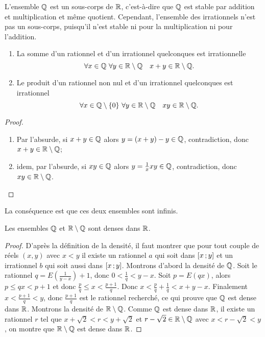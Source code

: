 L'ensemble \(\mathbb{Q}\) est un sous-corps de \(\mathbb{R}\), c'est-à-dire que \(\mathbb{Q}\) est 
stable par addition et multiplication et même quotient. Cependant, l'ensemble 
des irrationnels n'est pas un sous-corps, puisqu'il n'est stable ni pour la 
multiplication ni pour l'addition.

\begin{prop}
  \begin{enumerate}
    \item La somme d'un rationnel et d'un irrationnel quelconques est 
      irrationnelle
      \begin{equation}
        \forall x \in \mathbb{Q} \ \forall y \in \mathbb{R}\setminus\mathbb{Q} \quad x + y \in 
        \mathbb{R}\setminus\mathbb{Q}.
      \end{equation}
    \item Le produit d'un rationnel non nul et d'un irrationnel quelconques est 
      irrationnel
      \begin{equation}
        \forall x \in \mathbb{Q}\setminus\{0\} \ \forall y \in \mathbb{R}\setminus\mathbb{Q} \quad xy 
        \in \mathbb{R}\setminus\mathbb{Q}.
      \end{equation}
  \end{enumerate}
\end{prop}

\begin{proof}
  \begin{enumerate}
    \item Par l'absurde, si \(x + y\in\mathbb{Q}\) alors \(y = (x + y) - y \in \mathbb{Q}\), 
      contradiction, donc \(x + y\in\mathbb{R}\setminus\mathbb{Q}\);
    \item idem, par l'absurde, si \(xy\in \mathbb{Q}\) alors \(y = \frac{1}{x}xy\in\mathbb{Q}\), 
      contradiction, donc \(xy\in\mathbb{R}\setminus\mathbb{Q}\).
  \end{enumerate}
\end{proof}

La conséquence est que ces deux ensembles sont infinis.

\begin{theo}
  Les ensembles \(\mathbb{Q}\) et \(\mathbb{R}\setminus\mathbb{Q}\) sont denses dans \(\mathbb{R}\).
\end{theo}

\begin{proof}
  D'après la définition de la densité, il faut montrer que pour tout couple de 
  réels \((x, y)\) avec \(x<y\) il existe un rationnel \(a\) qui soit dans 
  \(\left[ x \, ; {} y \right]\) et un irrationnel \(b\) qui soit aussi dans 
  \(\left[ x \, ; {} y \right]\). Montrons d'abord la densité de \(\mathbb{Q}\). Soit le 
  rationnel \(q = E\left(\frac{1}{y - x}\right) + 1\), donc \(0<\frac{1}{q}<y - 
  x\).  Soit \(p = E(qx)\), alors \(p\leqslant qx<p + 1\) et donc 
  \(\frac{p}{q}\leqslant x <\frac{p + 1}{q}\). Donc \(x<\frac{p}{q} + 
  \frac{1}{q}<x + y - x\). Finalement \(x<\frac{p + 1}{q}<y\), donc \(\frac{p + 
  1}{q}\) est le rationnel recherché, ce qui prouve que \(\mathbb{Q}\) est dense dans 
  \(\mathbb{R}\). Montrons la densité de \(\mathbb{R}\setminus\mathbb{Q}\). Comme \(\mathbb{Q}\) est dense dans 
  \(\mathbb{R}\), il existe un rationnel \(r\) tel que \(x + \sqrt{2}<r<y + \sqrt{2}\) 
  et \(r - \sqrt{2}\in\mathbb{R}\setminus\mathbb{Q}\) avec \(x<r - \sqrt{2}<y\), on montre que  
  \(\mathbb{R}\setminus\mathbb{Q}\) est dense dans \(\mathbb{R}\).
\end{proof}

